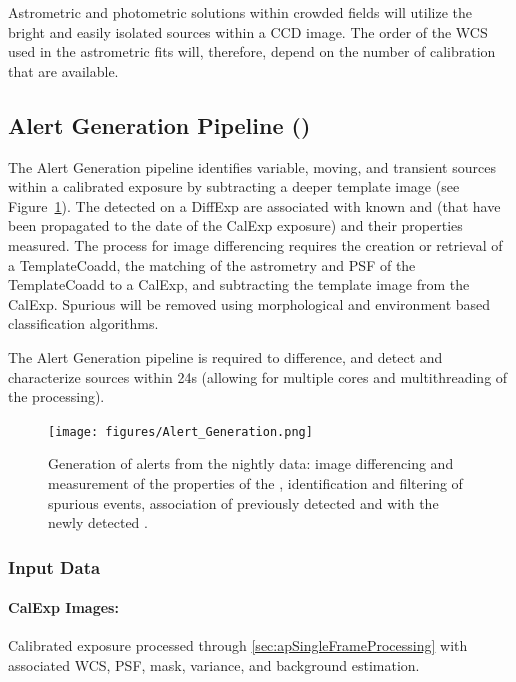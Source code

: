Astrometric and photometric solutions  within crowded fields will utilize the bright and easily isolated sources within a CCD image. The order of the WCS used in the astrometric fits will, therefore, depend on the number of calibration \Sources that are available.

\subsection{Alert Generation Pipeline (\wbsDiffim)}
\label{sec:apAlertGeneration}

The Alert Generation pipeline identifies variable, moving, and transient sources within a calibrated exposure by subtracting a deeper template image (see Figure~\ref{fig:apAlertgen}). The \DIASources detected on a DiffExp are associated with known \DIAObjects and \SSObjects (that have been propagated to the date of the CalExp exposure) and their properties measured. The process for image differencing requires the creation or retrieval of a TemplateCoadd, the matching of the  astrometry and PSF of the TemplateCoadd to a CalExp, and subtracting the template image from the CalExp. Spurious \DIASources will be removed using morphological and environment based classification algorithms.

The Alert Generation pipeline is required to difference, and detect and characterize \DIASource sources within 24s (allowing for multiple cores and multithreading of the processing).


\begin{figure}[th]
\begin{center}
\texttt{[image: figures/Alert\_Generation.png]}
\caption{\label{fig:apAlertgen} Generation of alerts from the nightly data: image differencing and measurement of the properties of the \DIASources, identification and filtering of spurious events, association of previously detected \DIAObjects and \SSObjects with the newly detected \DIASources. }
\end{center}
\end{figure}
\subsubsection{Input Data}
\label{sec:apAGInput}

\paragraph*{CalExp Images:} Calibrated exposure processed through \ref{sec:apSingleFrameProcessing} with associated WCS, PSF, mask, variance, and background estimation.

